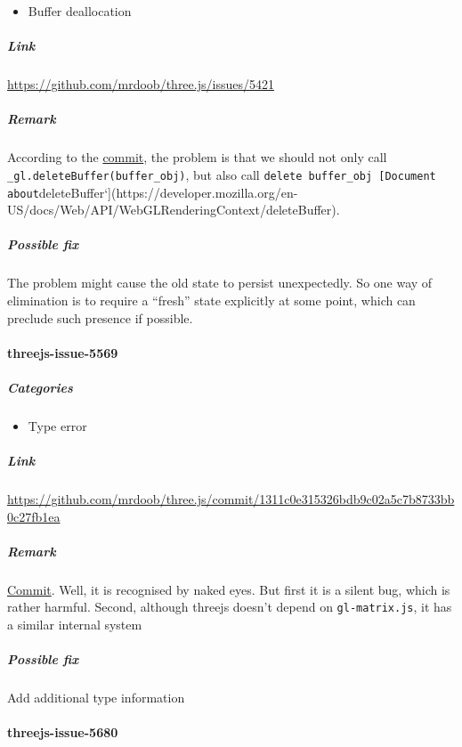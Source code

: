 \documentclass[]{article}
\begin{document}
\begin{itemize}
\itemsep1pt\parskip0pt
\item
  Buffer deallocation
\end{itemize}

\subparagraph{Link}\label{link-8}

\url{https://github.com/mrdoob/three.js/issues/5421}

\subparagraph{Remark}\label{remark-8}

According to the
\href{https://github.com/mrdoob/three.js/commit/70ca93c2fe184795e5410a6b30e625dee43af870}{commit},
the problem is that we should not only call
\texttt{\_gl.deleteBuffer(buffer\_obj)}, but also call
\texttt{delete buffer\_obj {[}Document about}deleteBuffer`{]}(https://developer.mozilla.org/en-US/docs/Web/API/WebGLRenderingContext/deleteBuffer).

\subparagraph{Possible fix}\label{possible-fix-7}

The problem might cause the old state to persist unexpectedly. So one
way of elimination is to require a ``fresh'' state explicitly at some
point, which can preclude such presence if possible.

\paragraph{threejs-issue-5569}\label{threejs-issue-5569}

\subparagraph{Categories}\label{categories-9}

\begin{itemize}
\itemsep1pt\parskip0pt
\item
  Type error
\end{itemize}

\subparagraph{Link}\label{link-9}

\url{https://github.com/mrdoob/three.js/commit/1311c0e315326bdb9c02a5c7b8733bb0c27fb1ea}

\subparagraph{Remark}\label{remark-9}

\href{https://github.com/mrdoob/three.js/commit/1311c0e315326bdb9c02a5c7b8733bb0c27fb1ea}{Commit}.
Well, it is recognised by naked eyes. But first it is a silent bug,
which is rather harmful. Second, although threejs doesn't depend on
\texttt{gl-matrix.js}, it has a similar internal system

\subparagraph{Possible fix}\label{possible-fix-8}

Add additional type information

\paragraph{threejs-issue-5680}\label{threejs-issue-5680}
\end{document}
